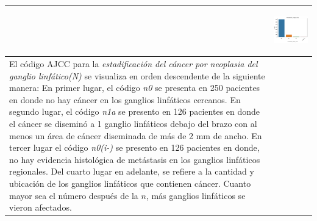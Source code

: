 \begin{table}[!htb]
\begin{threeparttable}
\begin{tabular}{p{8cm} p{7cm}}
			& \begin{center}\includegraphics[width=1\linewidth]{NOTEBOOK/IMAGENES_DESCRIPTIVAS/2_metastasis_stage_code}\end{center}
			\\ \hline
			El código AJCC para la \textit{estadificación del cáncer por neoplasia del ganglio linfático(N)} se visualiza en orden descendente de la siguiente manera: En primer lugar, el código \textit{n0} se presenta en 250 pacientes en donde no hay cáncer en los ganglios linfáticos cercanos. En segundo lugar, el código \textit{n1a} se presento en 126 pacientes en donde el cáncer se diseminó a 1 ganglio linfáticos debajo del brazo con al menos un área de cáncer diseminada de más de 2 mm de ancho. En tercer lugar el código \textit{n0(i-)} se presento en 126 pacientes en donde, no hay evidencia histológica de metástasis en los ganglios linfáticos regionales. Del cuarto lugar en adelante, se refiere a la cantidad y ubicación de los ganglios linfáticos que contienen cáncer. Cuanto mayor sea el número después de la $n$, más ganglios linfáticos se vieron afectados.	
			

\end{tabular}
\end{threeparttable}
\end{table}
